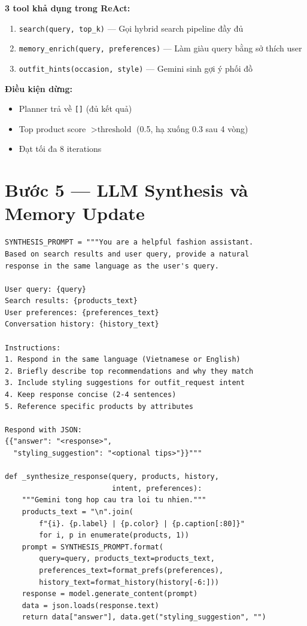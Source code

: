 \documentclass[12pt,a4paper]{report}
\begin{document}
\textbf{3 tool khả dụng trong ReAct:}
\begin{enumerate}
    \item \texttt{search(query, top\_k)} --- Gọi hybrid search pipeline đầy đủ
    \item \texttt{memory\_enrich(query, preferences)} --- Làm giàu query bằng sở thích user
    \item \texttt{outfit\_hints(occasion, style)} --- Gemini sinh gợi ý phối đồ
\end{enumerate}

\textbf{Điều kiện dừng:}
\begin{itemize}
    \item Planner trả về \texttt{[]} (đủ kết quả)
    \item Top product score $> \text{threshold}$ (0.5, hạ xuống 0.3 sau 4 vòng)
    \item Đạt tối đa 8 iterations
\end{itemize}

\section{Bước 5 --- LLM Synthesis và Memory Update}

\begin{lstlisting}[caption={LLM Synthesis --- agent/fashion\_agent.py}]
SYNTHESIS_PROMPT = """You are a helpful fashion assistant.
Based on search results and user query, provide a natural
response in the same language as the user's query.

User query: {query}
Search results: {products_text}
User preferences: {preferences_text}
Conversation history: {history_text}

Instructions:
1. Respond in the same language (Vietnamese or English)
2. Briefly describe top recommendations and why they match
3. Include styling suggestions for outfit_request intent
4. Keep response concise (2-4 sentences)
5. Reference specific products by attributes

Respond with JSON:
{{"answer": "<response>",
  "styling_suggestion": "<optional tips>"}}"""

def _synthesize_response(query, products, history,
                         intent, preferences):
    """Gemini tong hop cau tra loi tu nhien."""
    products_text = "\n".join(
        f"{i}. {p.label} | {p.color} | {p.caption[:80]}"
        for i, p in enumerate(products, 1))
    prompt = SYNTHESIS_PROMPT.format(
        query=query, products_text=products_text,
        preferences_text=format_prefs(preferences),
        history_text=format_history(history[-6:]))
    response = model.generate_content(prompt)
    data = json.loads(response.text)
    return data["answer"], data.get("styling_suggestion", "")
\end{lstlisting}
\end{document}
